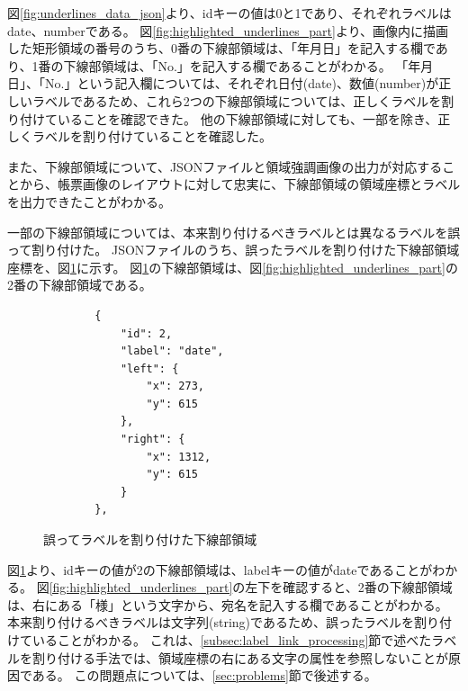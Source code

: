図\ref{fig:underlines_data_json}より、idキーの値は0と1であり、それぞれラベルはdate、numberである。
図\ref{fig:highlighted_underlines_part}より、画像内に描画した矩形領域の番号のうち、0番の下線部領域は、「年月日」を記入する欄であり、1番の下線部領域は、「No.」を記入する欄であることがわかる。
「年月日」、「No.」という記入欄については、それぞれ日付(date)、数値(number)が正しいラベルであるため、これら2つの下線部領域については、正しくラベルを割り付けていることを確認できた。
他の下線部領域に対しても、一部を除き、正しくラベルを割り付けていることを確認した。

また、下線部領域について、JSONファイルと領域強調画像の出力が対応することから、帳票画像のレイアウトに対して忠実に、下線部領域の領域座標とラベルを出力できたことがわかる。

一部の下線部領域については、本来割り付けるべきラベルとは異なるラベルを誤って割り付けた。
JSONファイルのうち、誤ったラベルを割り付けた下線部領域座標を、図\ref{fig:underlines_data_miss_json}に示す。
図\ref{fig:underlines_data_miss_json}の下線部領域は、図\ref{fig:highlighted_underlines_part}の2番の下線部領域である。

\lstset{language=}
\begin{figure}[t]
    \begin{lstlisting}
        {
            "id": 2,
            "label": "date",
            "left": {
                "x": 273,
                "y": 615
            },
            "right": {
                "x": 1312,
                "y": 615
            }
        },
    \end{lstlisting}
    \caption{誤ってラベルを割り付けた下線部領域}\label{fig:underlines_data_miss_json}
\end{figure}

図\ref{fig:underlines_data_miss_json}より、idキーの値が2の下線部領域は、labelキーの値がdateであることがわかる。
図\ref{fig:highlighted_underlines_part}の左下を確認すると、2番の下線部領域は、右にある「様」という文字から、宛名を記入する欄であることがわかる。
本来割り付けるべきラベルは文字列(string)であるため、誤ったラベルを割り付けていることがわかる。
これは、\ref{subsec:label_link_processing}節で述べたラベルを割り付ける手法では、領域座標の右にある文字の属性を参照しないことが原因である。
この問題点については、\ref{sec:problems}節で後述する。